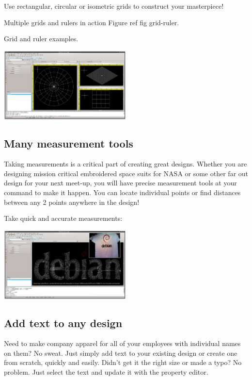 \documentclass[10pt]{report}
\begin{document}
Use rectangular, circular or isometric grids to construct your masterpiece!

Multiple grids and rulers in action Figure ref fig grid-ruler.

Grid and ruler examples.

\includegraphics[width=0.5\textwidth]{images/features-grid-ruler-1.png}

\subsection{Many measurement tools}

Taking measurements is a critical part of creating great designs. Whether you are designing
mission critical embroidered space suits for NASA or some other far out design for your next
meet-up, you will have precise measurement tools at your command to make it happen. You can
locate individual points or find distances between any 2 points anywhere in the design!

Take quick and accurate measurements:

\includegraphics[width=0.5\textwidth]{images/features-measure-1.png}

\subsection{Add text to any design}

Need to make company apparel for all of your employees with individual names on them? No sweat.
Just simply add text to your existing design or create one from scratch, quickly and easily.
Didn't get it the right size or made a typo? No problem. Just select the text and update it
with the property editor.
\end{document}
